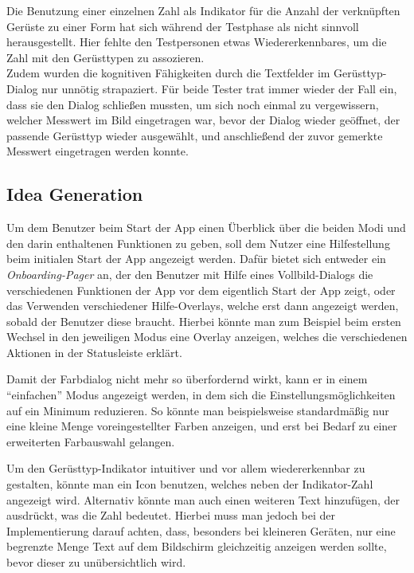 Die Benutzung einer einzelnen Zahl als Indikator für die Anzahl der verknüpften Gerüste zu einer Form hat sich während der Testphase als nicht sinnvoll herausgestellt.
Hier fehlte den Testpersonen etwas Wiedererkennbares, um die Zahl mit den Gerüsttypen zu assozieren.  \\

Zudem wurden die kognitiven Fähigkeiten durch die Textfelder im Gerüsttyp-Dialog nur unnötig strapaziert.
Für beide Tester trat immer wieder der Fall ein, dass sie den Dialog schließen mussten, um sich noch einmal zu vergewissern, welcher Messwert im Bild eingetragen war, bevor der Dialog wieder geöffnet, der passende Gerüsttyp wieder ausgewählt, und anschließend der zuvor gemerkte Messwert eingetragen werden konnte. \\


\subsection{Idea Generation}\label{subsec:idea3}
Um dem Benutzer beim Start der App einen Überblick über die beiden Modi und den darin enthaltenen Funktionen zu geben, soll dem Nutzer eine Hilfestellung beim initialen Start der App angezeigt werden.
Dafür bietet sich entweder ein \emph{Onboarding-Pager} an, der den Benutzer mit Hilfe eines Vollbild-Dialogs die verschiedenen Funktionen der App vor dem eigentlich Start der App zeigt, oder das Verwenden verschiedener Hilfe-Overlays, welche erst dann angezeigt werden, sobald der Benutzer diese braucht.
Hierbei könnte man zum Beispiel beim ersten Wechsel in den jeweiligen Modus eine Overlay anzeigen, welches die verschiedenen Aktionen in der Statusleiste erklärt. \\

Damit der Farbdialog nicht mehr so überfordernd wirkt, kann er in einem ``einfachen'' Modus angezeigt werden, in dem sich die Einstellungsmöglichkeiten auf ein Minimum reduzieren.
So könnte man beispielsweise standardmäßig nur eine kleine Menge voreingestellter Farben anzeigen, und erst bei Bedarf zu einer erweiterten Farbauswahl gelangen. \\

Um den Gerüsttyp-Indikator intuitiver und vor allem wiedererkennbar zu gestalten, könnte man ein Icon benutzen, welches neben der Indikator-Zahl angezeigt wird.
Alternativ könnte man auch einen weiteren Text hinzufügen, der ausdrückt, was die Zahl bedeutet.
Hierbei muss man jedoch bei der Implementierung darauf achten, dass, besonders bei kleineren Geräten, nur eine begrenzte Menge Text auf dem Bildschirm gleichzeitig anzeigen werden sollte, bevor dieser zu unübersichtlich wird. \\


